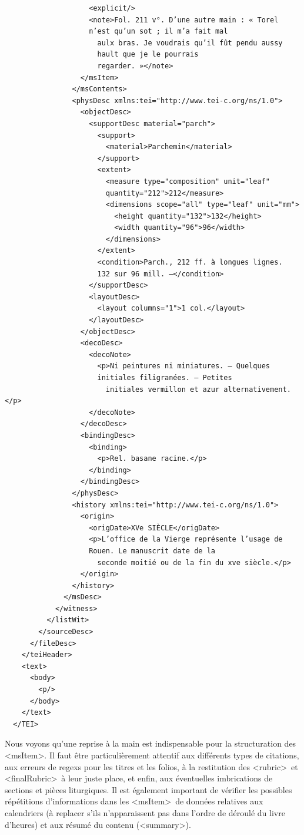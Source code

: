 \documentclass[a4paper,12pt,twoside]{book}
\begin{document}
\begin{verbatim}
                    <explicit/>
                    <note>Fol. 211 v°. D’une autre main : « Torel 
                    n’est qu’un sot ; il m’a fait mal
                      aulx bras. Je voudrais qu’il fût pendu aussy 
                      hault que je le pourrais
                      regarder. »</note>
                  </msItem>
                </msContents>
                <physDesc xmlns:tei="http://www.tei-c.org/ns/1.0">
                  <objectDesc>
                    <supportDesc material="parch">
                      <support>
                        <material>Parchemin</material>
                      </support>
                      <extent>
                        <measure type="composition" unit="leaf" 
                        quantity="212">212</measure>
                        <dimensions scope="all" type="leaf" unit="mm">
                          <height quantity="132">132</height>
                          <width quantity="96">96</width>
                        </dimensions>
                      </extent>
                      <condition>Parch., 212 ff. à longues lignes.
                      132 sur 96 mill. —</condition>
                    </supportDesc>
                    <layoutDesc>
                      <layout columns="1">1 col.</layout>
                    </layoutDesc>
                  </objectDesc>
                  <decoDesc>
                    <decoNote>
                      <p>Ni peintures ni miniatures. — Quelques 
                      initiales filigranées. — Petites
                        initiales vermillon et azur alternativement.</p>
                    </decoNote>
                  </decoDesc>
                  <bindingDesc>
                    <binding>
                      <p>Rel. basane racine.</p>
                    </binding>
                  </bindingDesc>
                </physDesc>
                <history xmlns:tei="http://www.tei-c.org/ns/1.0">
                  <origin>
                    <origDate>XVe SIÈCLE</origDate>
                    <p>L’office de la Vierge représente l’usage de
                    Rouen. Le manuscrit date de la
                      seconde moitié ou de la fin du xve siècle.</p>
                  </origin>
                </history>
              </msDesc>
            </witness>
          </listWit>
        </sourceDesc>
      </fileDesc>
    </teiHeader>
    <text>
      <body>
        <p/>
      </body>
    </text>
  </TEI>
	\end{verbatim}
	
	Nous voyons qu'une reprise à la main est indispensable pour la structuration des \textless msItem\textgreater . Il faut être particulièrement attentif aux différents types de citations, aux erreurs de regexs pour les titres et les folios, à la restitution des \textless rubric\textgreater~et \textless finalRubric\textgreater~à leur juste place, et enfin, aux éventuelles imbrications de sections et pièces liturgiques. Il est également important de vérifier les possibles répétitions d'informations dans les \textless msItem\textgreater~de données relatives aux calendriers (à replacer s'ils n'apparaissent pas dans l'ordre de déroulé du livre d'heures) et aux résumé du contenu (\textless summary\textgreater).
	
\end{document}
